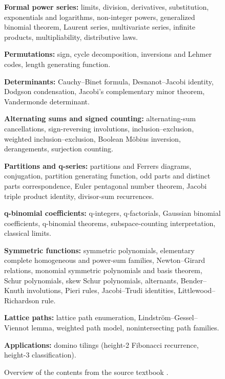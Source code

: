 \begin{figure}[b!]
\centering
\begin{tcolorbox}[
    colback=myboxcolor, %
    colframe=blue!40!black, %
    boxrule=1pt, %
    arc=4pt, %
    width=0.85\textwidth,
    title={Content overview},
    fonttitle=\bfseries
]
{\small
\textbf{Formal power series:} limits, division, derivatives, substitution, exponentials and logarithms, non-integer powers,  generalized binomial theorem, Laurent series, multivariate series, infinite products, multipliability, distributive laws.

\textbf{Permutations:} sign, cycle decomposition, inversions and Lehmer codes, length generating function.

\textbf{Determinants:} Cauchy--Binet formula, Desnanot--Jacobi identity, Dodgson condensation, Jacobi's complementary minor theorem, Vandermonde determinant.

\textbf{Alternating sums and signed counting:} alternating-sum cancellations, sign-reversing involutions, inclusion--exclusion, weighted inclusion--exclusion, Boolean Möbius inversion, derangements, surjection counting.

\textbf{Partitions and q-series:} partitions and Ferrers diagrams, conjugation, partition generating function, odd parts and distinct parts correspondence, Euler pentagonal number theorem, Jacobi triple product identity, divisor-sum recurrences.

\textbf{q-binomial coefficients:} q-integers, q-factorials, Gaussian binomial coefficients, q-binomial theorems, subspace-counting interpretation, classical limits.

\textbf{Symmetric functions:} symmetric polynomials, elementary complete homogeneous and power-sum families, Newton--Girard relations, monomial symmetric polynomials and basis theorem, Schur polynomials, skew Schur polynomials, alternants, Bender--Knuth involutions, Pieri rules, Jacobi--Trudi identities, Littlewood--Richardson rule.

\textbf{Lattice paths:} lattice path enumeration, Lindström--Gessel--Viennot lemma, weighted path model, nonintersecting path families.

\textbf{Applications:} domino tilings (height-2 Fibonacci recurrence, height-3 classification).
}
\end{tcolorbox}
\caption{Overview of the contents from the source textbook \citep{grinberg2025introduction}.}
\label{fig:contents}
\end{figure}

